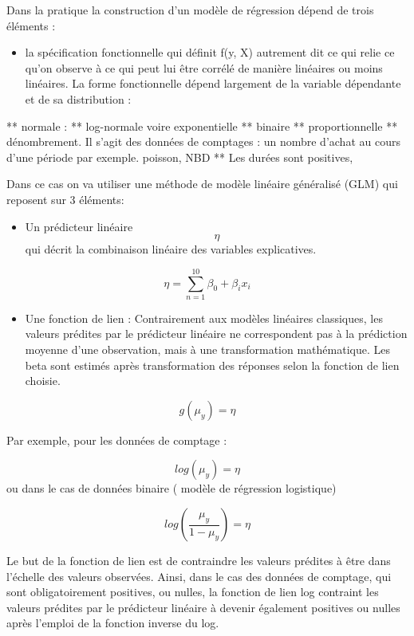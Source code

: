\documentclass[
]{book}
\providecommand{\tightlist}{%
  \setlength{\itemsep}{0pt}\setlength{\parskip}{0pt}}
\begin{document}
Dans la pratique la construction d'un modèle de régression dépend de trois éléments :

\begin{itemize}
\tightlist
\item
  la spécification fonctionnelle qui définit f(y, X) autrement dit ce qui relie ce qu'on observe à ce qui peut lui être corrélé de manière linéaires ou moins linéaires. La forme fonctionnelle dépend largement de la variable dépendante et de sa distribution :
\end{itemize}

** normale :
** log-normale voire exponentielle
** binaire
** proportionnelle
** dénombrement. Il s'agit des données de comptages : un nombre d'achat au cours d'une période par exemple. poisson, NBD
** Les durées sont positives,

Dans ce cas on va utiliser une méthode de modèle linéaire généralisé (GLM) qui reposent sur 3 éléments:

\begin{itemize}
\tightlist
\item
  Un prédicteur linéaire \[\eta\] qui décrit la combinaison linéaire des variables explicatives.
\end{itemize}

\[\eta=\sum_{n=1}^{10}\beta_{0}+\beta_{i}x_{i}\]

\begin{itemize}
\tightlist
\item
  Une fonction de lien : Contrairement aux modèles linéaires classiques, les valeurs prédites par le prédicteur linéaire ne correspondent pas à la prédiction moyenne d'une observation, mais à une transformation mathématique. Les beta sont estimés après transformation des réponses selon la fonction de lien choisie.
\end{itemize}

\[g(\mu_{y})=\eta\]

Par exemple, pour les données de comptage :

\[log(\mu_{y})=\eta\]
ou dans le cas de données binaire ( modèle de régression logistique)

\[log(\frac{\mu_{y}}{1-\mu_{y}})=\eta\]

Le but de la fonction de lien est de contraindre les valeurs prédites à être dans l'échelle des valeurs observées. Ainsi, dans le cas des données de comptage, qui sont obligatoirement positives, ou nulles, la fonction de lien log contraint les valeurs prédites par le prédicteur linéaire à devenir également positives ou nulles après l'emploi de la fonction inverse du log.
\end{document}
